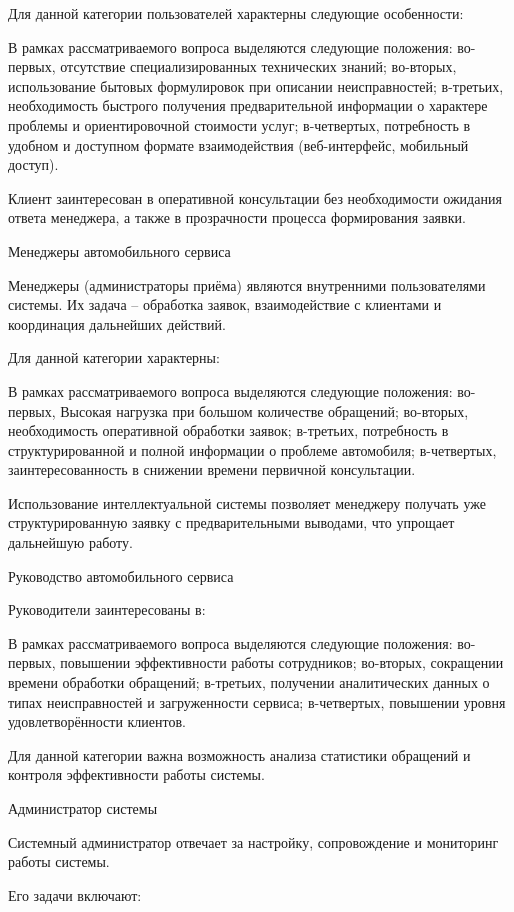 \documentclass[14pt,a4paper]{extarticle}
\numberwithin{figure}{section}
\numberwithin{table}{section}
\begin{document}
Для данной категории пользователей характерны следующие особенности:


В рамках рассматриваемого вопроса выделяются следующие положения: во-первых, отсутствие специализированных технических знаний; во-вторых, использование бытовых формулировок при описании неисправностей; в-третьих, необходимость быстрого получения предварительной информации о характере проблемы и ориентировочной стоимости услуг; в-четвертых, потребность в удобном и доступном формате взаимодействия (веб-интерфейс, мобильный доступ).


Клиент заинтересован в оперативной консультации без необходимости
ожидания ответа менеджера, а также в прозрачности процесса формирования
заявки.

Менеджеры автомобильного сервиса

Менеджеры (администраторы приёма) являются внутренними пользователями
системы. Их задача -- обработка заявок, взаимодействие с клиентами и
координация дальнейших действий.

Для данной категории характерны:


В рамках рассматриваемого вопроса выделяются следующие положения: во-первых, Высокая нагрузка при большом количестве обращений; во-вторых, необходимость оперативной обработки заявок; в-третьих, потребность в структурированной и полной информации о проблеме автомобиля; в-четвертых, заинтересованность в снижении времени первичной консультации.


Использование интеллектуальной системы позволяет менеджеру получать уже
структурированную заявку с предварительными выводами, что упрощает
дальнейшую работу.

Руководство автомобильного сервиса

Руководители заинтересованы в:


В рамках рассматриваемого вопроса выделяются следующие положения: во-первых, повышении эффективности работы сотрудников; во-вторых, сокращении времени обработки обращений; в-третьих, получении аналитических данных о типах неисправностей и загруженности сервиса; в-четвертых, повышении уровня удовлетворённости клиентов.


Для данной категории важна возможность анализа статистики обращений и
контроля эффективности работы системы.

Администратор системы

Системный администратор отвечает за настройку, сопровождение и
мониторинг работы системы.

Его задачи включают:
\end{document}
